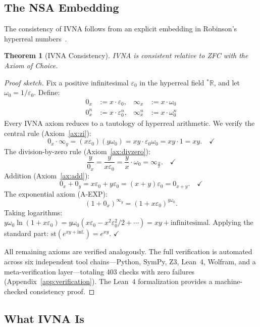 \documentclass[12pt]{article}
\newtheorem{theorem}{Theorem}[section]
\theoremstyle{definition}
\theoremstyle{remark}
\newcommand{\vz}[1]{0_{#1}}             %
\newcommand{\vi}[1]{\infty_{#1}}        %
\newcommand{\vzn}[2]{0^{#1}_{#2}}       %
\newcommand{\vin}[2]{\infty^{#1}_{#2}}  %
\newcommand{\R}{\mathbb{R}}
\begin{document}
\subsection{The NSA Embedding}

The consistency of IVNA follows from an explicit embedding in Robinson's
hyperreal numbers~\cite{robinson1966}.

\begin{theorem}[IVNA Consistency]
\label{thm:consistency}
IVNA is consistent relative to ZFC with the Axiom of Choice.
\end{theorem}

\begin{proof}[Proof sketch]
Fix a positive infinitesimal $\varepsilon_0$ in the hyperreal field
${}^*\!\R$, and let $\omega_0 = 1/\varepsilon_0$. Define:
\begin{align*}
\vz{x}   &:= x \cdot \varepsilon_0, &
\vi{x}   &:= x \cdot \omega_0 \\
\vzn{n}{x} &:= x \cdot \varepsilon_0^n, &
\vin{n}{x} &:= x \cdot \omega_0^n
\end{align*}
Every IVNA axiom reduces to a tautology of hyperreal arithmetic.
We verify the central rule (Axiom~\ref{ax:zi}):
\[
\vz{x} \cdot \vi{y} = (x\varepsilon_0)(y\omega_0)
= xy \cdot \varepsilon_0 \omega_0 = xy \cdot 1 = xy. \quad\checkmark
\]
The division-by-zero rule (Axiom~\ref{ax:divzero}):
\[
\frac{y}{\vz{x}} = \frac{y}{x\varepsilon_0}
= \frac{y}{x} \cdot \omega_0 = \vi{\frac{y}{x}}. \quad\checkmark
\]
Addition (Axiom~\ref{ax:add}):
\[
\vz{x} + \vz{y} = x\varepsilon_0 + y\varepsilon_0
= (x+y)\varepsilon_0 = \vz{x+y}. \quad\checkmark
\]
The exponential axiom (A-EXP):
\[
(1 + \vz{x})^{\vi{y}} = (1 + x\varepsilon_0)^{y\omega_0}.
\]
Taking logarithms: $y\omega_0 \ln(1 + x\varepsilon_0) =
y\omega_0(x\varepsilon_0 - x^2\varepsilon_0^2/2 + \cdots) = xy +
\text{infinitesimal}$. Applying the standard part:
$\mathrm{st}(e^{xy + \text{inf.}}) = e^{xy}$. $\checkmark$

All remaining axioms are verified analogously.
The full verification is automated across six independent tool
chains---Python, SymPy, Z3, Lean~4, Wolfram, and a meta-verification
layer---totaling 403 checks with zero failures
(Appendix~\ref{app:verification}).
The Lean~4 formalization provides a machine-checked consistency proof.
\end{proof}

\subsection{What IVNA Is}
\end{document}
